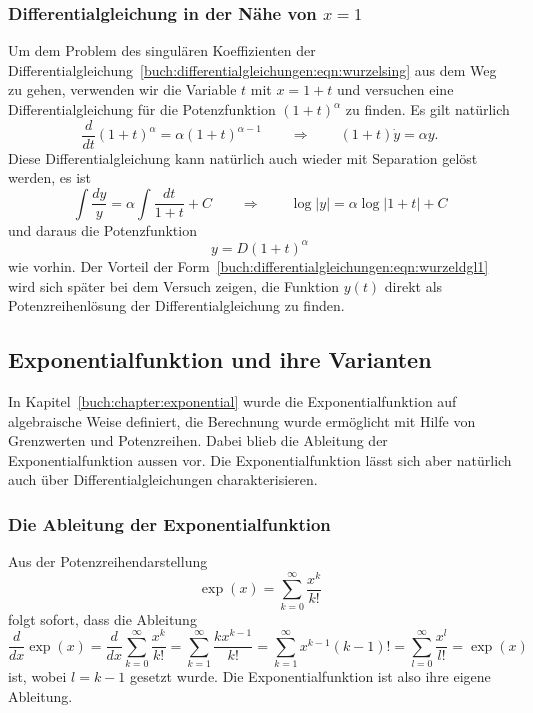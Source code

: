 %
%
\subsubsection{Differentialgleichung in der Nähe von $x=1$}
Um dem Problem des singulären Koeffizienten der
Differentialgleichung~\eqref{buch:differentialgleichungen:eqn:wurzelsing}
aus dem Weg zu gehen, verwenden wir die Variable $t$ mit $x=1+t$ und
versuchen eine Differentialgleichung für die Potenzfunktion
$(1+t)^\alpha$ zu finden.
Es gilt natürlich
\begin{equation}
\frac{d}{dt} (1+t)^\alpha
=
\alpha (1+t)^{\alpha-1}
\qquad\Rightarrow\qquad
(1+t) \dot{y} = \alpha y.
\label{buch:differentialgleichungen:eqn:wurzeldgl1}
\end{equation}
Diese Differentialgleichung kann natürlich auch wieder mit Separation
gelöst werden, es ist
\begin{equation}
\int
\frac{dy}{y} 
=
\alpha
\int
\frac{dt}{1+t}
+
C
\qquad\Rightarrow\qquad
\log|y| = \alpha \log|1+t| + C
\label{buch:differentialgleichungen:eqn:wurzeldgl1loesung}
\end{equation}
und daraus die Potenzfunktion
\[
y=D(1+t)^\alpha
\]
wie vorhin.
Der Vorteil der
Form~\eqref{buch:differentialgleichungen:eqn:wurzeldgl1}
wird sich später bei dem Versuch zeigen, die Funktion $y(t)$
direkt als Potenzreihenlösung der Differentialgleichung zu finden.

%
%
\subsection{Exponentialfunktion und ihre Varianten
\label{buch:differentialgleichungen:subsection:exponentialfunktion}}
%
In Kapitel~\ref{buch:chapter:exponential} wurde die Exponentialfunktion
auf algebraische Weise definiert, die Berechnung wurde ermöglicht
mit Hilfe von Grenzwerten und Potenzreihen.
Dabei blieb die Ableitung der Exponentialfunktion aussen vor.
Die Exponentialfunktion lässt sich aber natürlich auch über
Differentialgleichungen charakterisieren.

%
%
\subsubsection{Die Ableitung der Exponentialfunktion}
%
Aus der Potenzreihendarstellung
\[
\exp(x)
=
\sum_{k=0}^\infty \frac{x^k}{k!}
\]
folgt sofort, dass die Ableitung
\[
\frac{d}{dx}\exp(x)
=
\frac{d}{dx}
\sum_{k=0}^\infty
\frac{x^k}{k!}
=
\sum_{k=1}^\infty \frac{kx^{k-1}}{k!}
=
\sum_{k=1}^\infty{x^{k-1}}{(k-1)!}
=
\sum_{l=0}^\infty \frac{x^l}{l!}
=
\exp(x)
\]
ist,
wobei $l=k-1$ gesetzt wurde.
Die Exponentialfunktion ist also ihre eigene Ableitung.

